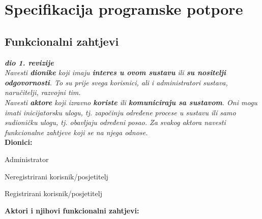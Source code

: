 \chapter{Specifikacija programske potpore}
		
	\section{Funkcionalni zahtjevi}
			
			\textbf{\textit{dio 1. revizije}}\\
			
			\textit{Navesti \textbf{dionike} koji imaju \textbf{interes u ovom sustavu} ili  \textbf{su nositelji odgovornosti}. To su prije svega korisnici, ali i administratori sustava, naručitelji, razvojni tim.}\\
				
			\textit{Navesti \textbf{aktore} koji izravno \textbf{koriste} ili \textbf{komuniciraju sa sustavom}. Oni mogu imati inicijatorsku ulogu, tj. započinju određene procese u sustavu ili samo sudioničku ulogu, tj. obavljaju određeni posao. Za svakog aktora navesti funkcionalne zahtjeve koji se na njega odnose.}\\
			
			
			\noindent \textbf{Dionici:}
			
			\begin{packed_enum}
				
				\item Administrator
				\item Neregistrirani korisnik/posjetitelj			
				\item Registrirani korisnik/posjetitelj
				
			\end{packed_enum}
			
			\noindent \textbf{Aktori i njihovi funkcionalni zahtjevi:}
			

